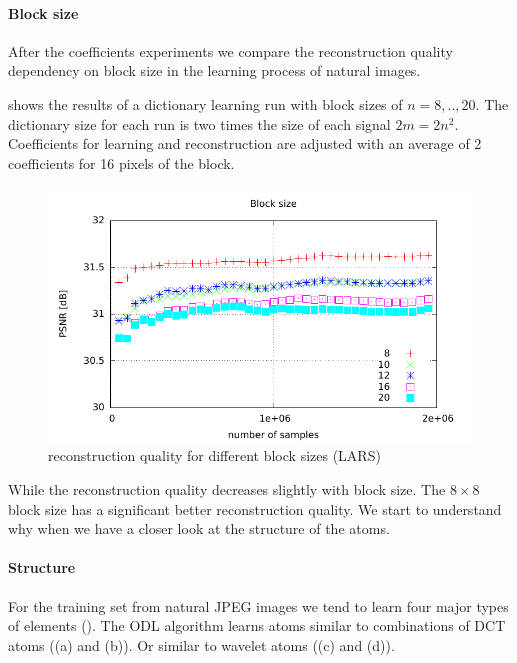 


\paragraph{Block size}
After the coefficients experiments we compare the reconstruction quality
dependency on block size in the learning process of natural images. 

 shows the results of a dictionary
learning run with block sizes of $n=8,..,20$. The dictionary size for each run
is two times the size of each signal $2m=2n^2$. Coefficients for learning and
reconstruction are adjusted with an average of 2 coefficients for 16 pixels of
the block.

\begin{figure}[h]
\centering
\includegraphics[width =
1.0\textwidth]{../tests/results/blockSizeConverg.pdf}
\caption{reconstruction quality for different block sizes (LARS)}
\label{fig:blockSize}
\end{figure}

While the reconstruction quality decreases slightly with block size. 
The $8\times8$ block size has a significant better reconstruction quality. 
We start to understand why when we have a closer look at the structure of
the atoms. 

\paragraph{Structure}
For the training set from natural JPEG images we tend to learn four major types
of elements ().
The ODL algorithm learns atoms similar to combinations of DCT atoms
((a) and (b)). Or similar to wavelet atoms ((c) and (d)).

